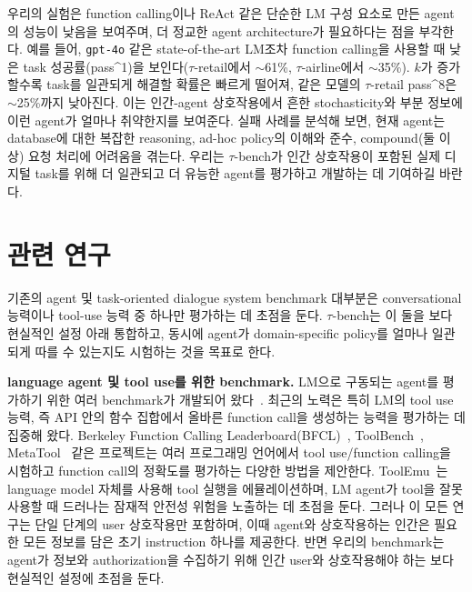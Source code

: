 \documentclass{article}
\newcommand{\benchmark}{$\tau$-bench}
\newcommand{\retail}{$\tau$-retail}  %
\newcommand{\airline}{$\tau$-airline}
\begin{document}
우리의 실험은 function calling이나 ReAct 같은 단순한 LM 구성 요소로 만든 agent의 성능이 낮음을 보여주며, 더 정교한 agent architecture가 필요하다는 점을 부각한다. 예를 들어, \texttt{gpt-4o} 같은 state-of-the-art LM조차 function calling을 사용할 때 낮은 task 성공률(pass\textasciicircum 1)을 보인다(\retail{}에서 $\sim$61\%, \airline{}에서 $\sim$35\%). $k$가 증가할수록 task를 일관되게 해결할 확률은 빠르게 떨어져, 같은 모델의 \retail{} pass\textasciicircum 8은 $\sim$25\%까지 낮아진다. 이는 인간-agent 상호작용에서 흔한 stochasticity와 부분 정보에 이런 agent가 얼마나 취약한지를 보여준다. 실패 사례를 분석해 보면, 현재 agent는 database에 대한 복잡한 reasoning, ad-hoc policy의 이해와 준수, compound(둘 이상) 요청 처리에 어려움을 겪는다. 우리는 \benchmark{}가 인간 상호작용이 포함된 실제 디지털 task를 위해 더 일관되고 더 유능한 agent를 평가하고 개발하는 데 기여하길 바란다.









\section{관련 연구}

기존의 agent 및 task-oriented dialogue system benchmark 대부분은 conversational 능력이나 tool-use 능력 중 하나만 평가하는 데 초점을 둔다. \benchmark{}는 이 둘을 보다 현실적인 설정 아래 통합하고, 동시에 agent가 domain-specific policy를 얼마나 일관되게 따를 수 있는지도 시험하는 것을 목표로 한다.

\textbf{language agent 및 tool use를 위한 benchmark.} LM으로 구동되는 agent를 평가하기 위한 여러 benchmark가 개발되어 왔다~\citep{yao2022webshop, zhou2023webarena, jimenez2023swe, liu2023agentbench, ruan2023identifying}. 최근의 노력은 특히 LM의 tool use 능력, 즉 API 안의 함수 집합에서 올바른 function call을 생성하는 능력을 평가하는 데 집중해 왔다. Berkeley Function Calling Leaderboard(BFCL)~\cite{berkeley-function-calling-leaderboard}, ToolBench~\cite{xu2023tool}, MetaTool~\cite{huang2023metatool} 같은 프로젝트는 여러 프로그래밍 언어에서 tool use/function calling을 시험하고 function call의 정확도를 평가하는 다양한 방법을 제안한다. ToolEmu~\cite{ruan2023identifying}는 language model 자체를 사용해 tool 실행을 에뮬레이션하며, LM agent가 tool을 잘못 사용할 때 드러나는 잠재적 안전성 위험을 노출하는 데 초점을 둔다.
그러나 이 모든 연구는 단일 단계의 user 상호작용만 포함하며, 이때 agent와 상호작용하는 인간은 필요한 모든 정보를 담은 초기 instruction 하나를 제공한다. 반면 우리의 benchmark는 agent가 정보와 authorization을 수집하기 위해 인간 user와 상호작용해야 하는 보다 현실적인 설정에 초점을 둔다.
\end{document}
